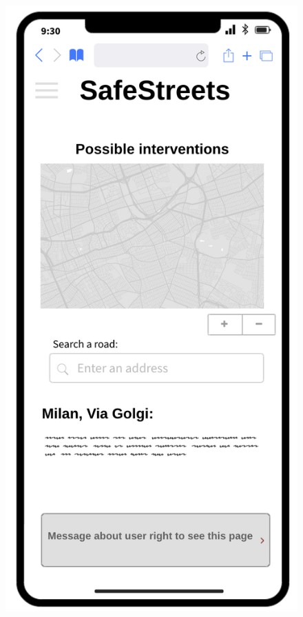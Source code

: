 	\begin{figure}[H]
	\centering
	\begin{minipage}[b]{0.40\textwidth}
		\includegraphics[width=\textwidth]{Images/rasd-mocks/interventions.png}

\end{minipage}
\end{figure}
